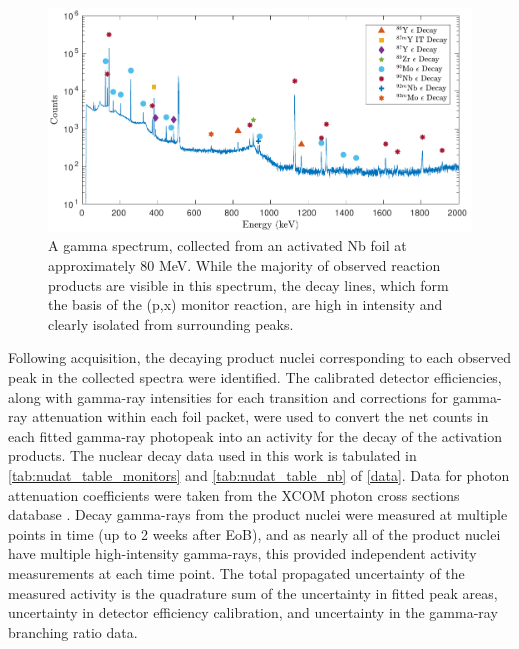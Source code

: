 \begin{figure}
 \centering
 \includegraphics[width=6in]{./figures/sample_gspec.pdf}
 \caption{A gamma spectrum, collected from an activated Nb foil at approximately 80 MeV. While the majority of observed reaction products are visible in this spectrum,  the  decay lines, which form the basis of the (p,x) monitor reaction, are high in intensity and clearly isolated from surrounding peaks.}
 \label{fig:gspec}
\end{figure}


Following  acquisition, the decaying product nuclei corresponding to each observed peak in the collected spectra were identified.
The calibrated detector efficiencies, along with gamma-ray intensities for each transition and  corrections for gamma-ray attenuation within each foil packet, were used to convert the net  counts in each fitted gamma-ray photopeak into an activity for the decay of the activation products.  
The nuclear decay data used in this work is tabulated in \autoref{tab:nudat_table_monitors} and \autoref{tab:nudat_table_nb} of \ref{data}.
Data for photon attenuation coefficients were taken from the XCOM photon cross sections database  \cite{berger2011xcom}.
Decay gamma-rays from the product nuclei were measured at multiple points in time (up to 2 weeks after EoB), and as nearly all of the product nuclei have multiple high-intensity gamma-rays, this provided independent activity measurements at each time point.
The total propagated uncertainty of the measured activity is the quadrature sum of the uncertainty in  fitted peak areas, uncertainty in detector efficiency calibration, and uncertainty in the gamma-ray branching ratio data.






